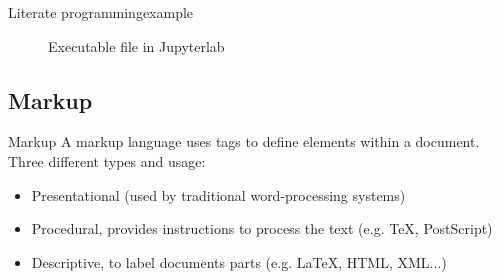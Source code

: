 \begin{frame}{Literate programming}{example}
{\begin{figure}
\caption{Executable file in Jupyterlab}
\end{figure}}
\end{frame}

\subsection*{Markup}
\begin{frame}[<+->]{Markup}
A markup language uses tags to deﬁne elements within a document. \newline
Three different types and usage:
\pause
\begin{itemize}
	\item Presentational (used by traditional word-processing systems)
	\item Procedural, provides instructions to process the text (e.g. TeX, PostScript)
	\item Descriptive, to label documents parts (e.g. LaTeX, HTML, XML...)
\end{itemize}
\end{frame}

